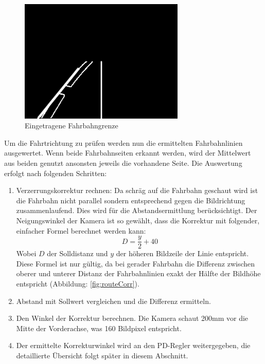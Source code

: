 \begin{figure}[H]%
\centering
\includegraphics[width=0.7\textwidth]{03_Loesungskonzept/pictures/Fahrbahnlinien.png}
\caption{Eingetragene Fahrbahngrenze}
\label{fig:routeLimits}
\end{figure}
Um die Fahrtrichtung zu prüfen werden nun die ermittelten Fahrbahnlinien ausgewertet. Wenn beide Fahrbahnseiten erkannt werden, wird der Mittelwert aus beiden genutzt ansonsten jeweils die vorhandene Seite. Die Auswertung erfolgt nach folgenden Schritten:
\begin{enumerate}
\item Verzerrungskorrektur rechnen: Da schräg auf die Fahrbahn geschaut wird ist die Fahrbahn nicht parallel sondern entsprechend gegen die Bildrichtung zusammenlaufend. Dies wird für die Abstandsermittlung berücksichtigt. Der Neigungswinkel der Kamera ist so gewählt, dass die Korrektur mit folgender, einfacher Formel berechnet werden kann:
\[
D = \frac{y}{2} + 40 
\]
Wobei $D$ der Solldistanz und $y$ der höheren Bildzeile der Linie entspricht. Diese Formel ist nur gültig, da bei gerader Fahrbahn die Differenz zwischen oberer und unterer Distanz der Fahrbahnlinien exakt der Hälfte der Bildhöhe entspricht (Abbildung: \ref{fig:routeCorr}).
\item Abstand mit Sollwert vergleichen und die Differenz ermitteln.
\item Den Winkel der Korrektur berechnen. Die Kamera schaut 200mm vor die Mitte der Vorderachse, was 160 Bildpixel entspricht.
\item Der ermittelte Korrekturwinkel wird an den PD-Regler weitergegeben, die detaillierte Übersicht folgt später in diesem Abschnitt.
\end{enumerate}
